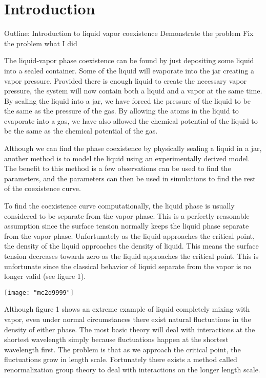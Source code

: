 \section{Introduction}
Outline:
Introduction to liquid vapor coexistence
Demonstrate the problem
Fix the problem
what I did

The liquid-vapor phase coexistence can be found by just depositing some liquid into a sealed container. Some of the liquid will evaporate into the jar creating a vapor pressure. Provided there is enough liquid to create the necessary vapor pressure, the system will now contain both a liquid and a vapor at the same time. By sealing the liquid into a jar, we have forced the pressure of the liquid to be the same as the pressure of the gas. By allowing the atoms in the liquid to evaporate into a gas, we have also allowed the chemical potential of the liquid to be the same as the chemical potential of the gas.

Although we can find the phase coexistence by physically sealing a liquid in a jar, another method is to model the liquid using an experimentally derived model. The benefit to this method is a few observations can be used to find the parameters, and the parameters can then be used in simulations to find the rest of the coexistence curve.

To find the coexistence curve computationally, the liquid phase is usually considered to be separate from the vapor phase. This is a perfectly reasonable assumption since the surface tension normally keeps the liquid phase separate from the vapor phase. Unfortunately as the liquid approaches the critical point, the density of the liquid approaches the density of liquid. This means the surface tension decreases towards zero as the liquid approaches the critical point. This is unfortunate since the classical behavior of liquid separate from the vapor is no longer valid (see figure 1).

\texttt{[image: "mc2d9999"]}

Although figure 1 shows an extreme example of liquid completely mixing with vapor, even under normal circumstances there exist natural fluctuations in the density of either phase. The most basic theory will deal with interactions at the shortest wavelength simply because fluctuations happen at the shortest wavelength first. The problem is that as we approach the critical point, the fluctuations grow in length scale. Fortunately there exists a method called renormalization group theory to deal with interactions on the longer length scale.

